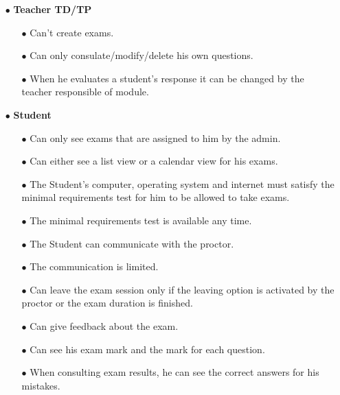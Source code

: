 \documentclass[]{uc2pfecaneva}
\begin{document}
\begin{itemize}
\begin{itemize}
            \item[$\bullet$]\textbf{Teacher TD/TP}
            \begin{itemize}
                \item[$\bullet$] Can’t create exams.
                \item[$\bullet$] Can only consulate/modify/delete his own questions.
                \item[$\bullet$] When he evaluates a student’s response it can be changed by the teacher responsible of module.
            \end{itemize}

            \item[$\bullet$]\textbf{Student}
            \begin{itemize}
                \item[$\bullet$] Can only see exams that are assigned to him by the admin.
                \item[$\bullet$] Can either see a list view or a calendar view for his exams.
                \item[$\bullet$] The Student’s computer, operating system and internet  must satisfy the minimal requirements test for him to be allowed to take exams.
                \item[$\bullet$] The  minimal requirements test is available any time.
                \item[$\bullet$] The Student can communicate with the proctor.
                \item[$\bullet$] The communication is limited.
                \item[$\bullet$] Can leave the exam session only if the leaving option is activated by the proctor or the exam duration is finished.
                \item[$\bullet$] Can give feedback about the exam.
                \item[$\bullet$] Can see his exam mark and the mark for each question.
                \item[$\bullet$] When consulting exam results, he can see the correct answers for his mistakes.
            \end{itemize}


\end{itemize}
\end{itemize}
\end{document}
